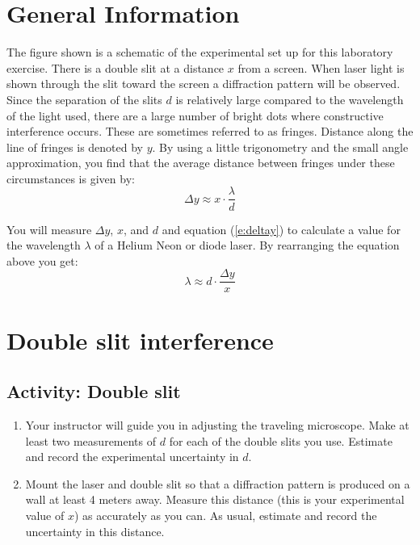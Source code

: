 \section{General Information}
The figure shown is a schematic of the experimental set up for this laboratory exercise. There is a double slit at a distance $x$ from a screen.  When laser light is shown through the slit toward the screen a diffraction pattern will be observed.  Since the separation of the slits $d$ is relatively large compared to the wavelength  of the light used, there are a large number of bright dots where constructive interference occurs.  These are sometimes referred to as fringes.  Distance along the line of fringes is denoted by $y$. By using a little trigonometry and the small angle approximation, you find that the average distance between fringes under these circumstances is given by: 
\begin{equation} \label{e:deltay}
	\Delta y \approx x  \cdot \frac{\lambda}{d}
\end{equation}

You will measure $\Delta y$, $x$, and $d$ and equation (\ref{e:deltay}) to calculate a value for the wavelength $\lambda$ of a Helium Neon or diode laser. By rearranging the equation above you get:
\begin{equation} \label{e:lambda}
	\lambda \approx d \cdot \frac{\Delta y}{x}
\end{equation}

\section {Double slit interference}

\subsection{Activity: Double slit}
\begin{enumerate}
	\item Your instructor will guide you in adjusting the traveling microscope.  Make at least two measurements of $d$ for each of the double slits you use.  Estimate and record the experimental uncertainty in $d$.
	\item 	Mount the laser and double slit so that a diffraction pattern is produced on a wall at least 4 meters away.  Measure this distance (this is your experimental value of $x$) as accurately as you can.  As usual, estimate and record the uncertainty in this distance.
\end{enumerate}

